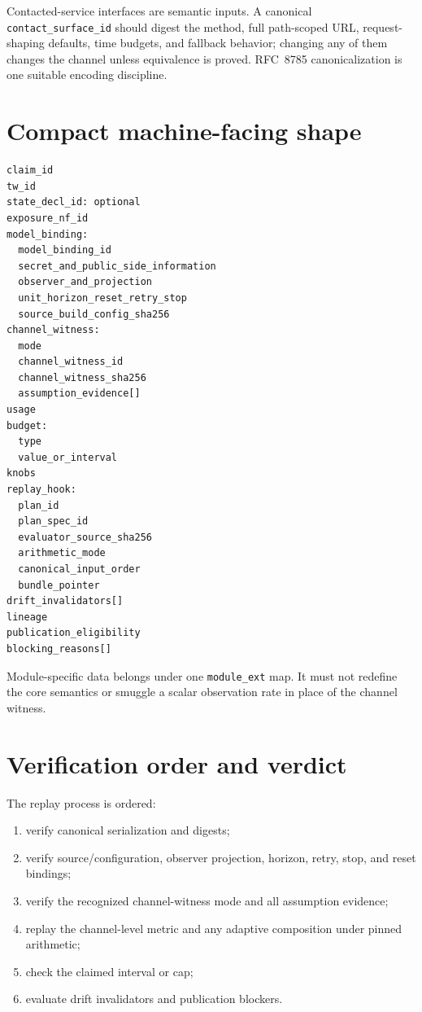 \documentclass[11pt]{article}
\begin{document}
Contacted-service interfaces are semantic inputs. A canonical \texttt{contact\_surface\_id} should digest the method, full path-scoped URL, request-shaping defaults, time budgets, and fallback behavior; changing any of them changes the channel unless equivalence is proved. RFC~8785 canonicalization is one suitable encoding discipline.\cite{rfc8785,series:deployedsurfaces,series:recert}

\section{Compact machine-facing shape}\label{sec:shape}
\begin{verbatim}
claim_id
tw_id
state_decl_id: optional
exposure_nf_id
model_binding:
  model_binding_id
  secret_and_public_side_information
  observer_and_projection
  unit_horizon_reset_retry_stop
  source_build_config_sha256
channel_witness:
  mode
  channel_witness_id
  channel_witness_sha256
  assumption_evidence[]
usage
budget:
  type
  value_or_interval
knobs
replay_hook:
  plan_id
  plan_spec_id
  evaluator_source_sha256
  arithmetic_mode
  canonical_input_order
  bundle_pointer
drift_invalidators[]
lineage
publication_eligibility
blocking_reasons[]
\end{verbatim}

Module-specific data belongs under one \texttt{module\_ext} map. It must not redefine the core semantics or smuggle a scalar observation rate in place of the channel witness.

\section{Verification order and verdict}\label{sec:verification}
The replay process is ordered:
\begin{enumerate}[leftmargin=*]
\item verify canonical serialization and digests;
\item verify source/configuration, observer projection, horizon, retry, stop, and reset bindings;
\item verify the recognized channel-witness mode and all assumption evidence;
\item replay the channel-level metric and any adaptive composition under pinned arithmetic;
\item check the claimed interval or cap;
\item evaluate drift invalidators and publication blockers.
\end{enumerate}
\end{document}

